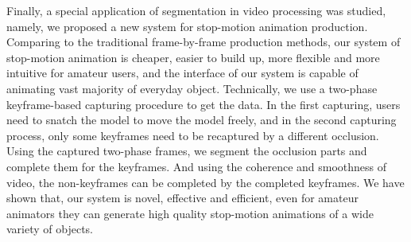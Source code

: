 \begin{englishabstract}
Finally, a special application of segmentation in video processing was studied, namely, we proposed a new system for stop-motion animation production. Comparing to the traditional frame-by-frame production methods, our system of stop-motion animation is cheaper, easier to build up, more flexible and more intuitive for amateur users, and the interface of our system is capable of animating vast majority of everyday object. Technically, we use a two-phase keyframe-based capturing procedure to get the data. In the first capturing, users need to snatch the model to move the model freely, and in the second capturing process, only some keyframes need to be recaptured by a different occlusion. Using the captured two-phase frames, we segment the occlusion parts and complete them for the keyframes. And using the coherence and smoothness of video, the non-keyframes can be completed by the completed keyframes. We have shown that, our system is novel, effective and efficient, even for amateur animators they can generate high quality stop-motion animations of a wide variety of objects.


\end{englishabstract}
